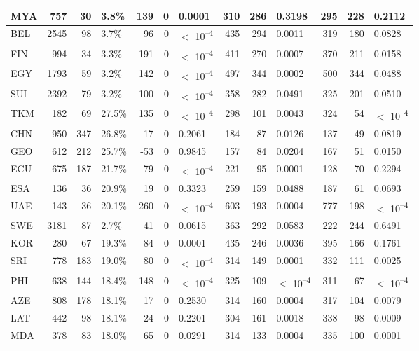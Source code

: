 \begin{tabular}{l|r|r|l|r|r|l|r|r|l|r|r|l}
\hline
MYA & 757 & 30 & 3.8\% & 139 & 0 & 0.0001 & 310 & 286 & 0.3198 & 295 & 228 & 0.2112\\
\hline
BEL & 2545 & 98 & 3.7\% & 96 & 0 & $<$ 10\textsuperscript{--4} & 435 & 294 & 0.0011 & 319 & 180 & 0.0828\\
\hline
FIN & 994 & 34 & 3.3\% & 191 & 0 & $<$ 10\textsuperscript{--4} & 411 & 270 & 0.0007 & 370 & 211 & 0.0158\\
\hline
EGY & 1793 & 59 & 3.2\% & 142 & 0 & $<$ 10\textsuperscript{--4} & 497 & 344 & 0.0002 & 500 & 344 & 0.0488\\
\hline
SUI & 2392 & 79 & 3.2\% & 100 & 0 & $<$ 10\textsuperscript{--4} & 358 & 282 & 0.0491 & 325 & 201 & 0.0510\\
\hline
TKM & 182 & 69 & 27.5\% & 135 & 0 & $<$ 10\textsuperscript{--4} & 298 & 101 & 0.0043 & 324 & 54 & $<$ 10\textsuperscript{--4}\\
\hline
CHN & 950 & 347 & 26.8\% & 17 & 0 & 0.2061 & 184 & 87 & 0.0126 & 137 & 49 & 0.0819\\
\hline
GEO & 612 & 212 & 25.7\% & -53 & 0 & 0.9845 & 157 & 84 & 0.0204 & 167 & 51 & 0.0150\\
\hline
ECU & 675 & 187 & 21.7\% & 79 & 0 & $<$ 10\textsuperscript{--4} & 221 & 95 & 0.0001 & 128 & 70 & 0.2294\\
\hline
ESA & 136 & 36 & 20.9\% & 19 & 0 & 0.3323 & 259 & 159 & 0.0488 & 187 & 61 & 0.0693\\
\hline
UAE & 143 & 36 & 20.1\% & 260 & 0 & $<$ 10\textsuperscript{--4} & 603 & 193 & 0.0004 & 777 & 198 & $<$ 10\textsuperscript{--4}\\
\hline
SWE & 3181 & 87 & 2.7\% & 41 & 0 & 0.0615 & 363 & 292 & 0.0583 & 222 & 244 & 0.6491\\
\hline
KOR & 280 & 67 & 19.3\% & 84 & 0 & 0.0001 & 435 & 246 & 0.0036 & 395 & 166 & 0.1761\\
\hline
SRI & 778 & 183 & 19.0\% & 80 & 0 & $<$ 10\textsuperscript{--4} & 314 & 149 & 0.0001 & 332 & 111 & 0.0025\\
\hline
PHI & 638 & 144 & 18.4\% & 148 & 0 & $<$ 10\textsuperscript{--4} & 325 & 109 & $<$ 10\textsuperscript{--4} & 311 & 67 & $<$ 10\textsuperscript{--4}\\
\hline
AZE & 808 & 178 & 18.1\% & 17 & 0 & 0.2530 & 314 & 160 & 0.0004 & 317 & 104 & 0.0079\\
\hline
LAT & 442 & 98 & 18.1\% & 24 & 0 & 0.2201 & 304 & 161 & 0.0018 & 338 & 98 & 0.0009\\
\hline
MDA & 378 & 83 & 18.0\% & 65 & 0 & 0.0291 & 314 & 133 & 0.0004 & 335 & 100 & 0.0001\\

\end{tabular}
